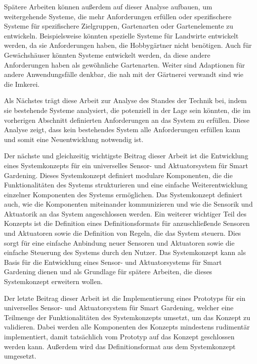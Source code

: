 Spätere Arbeiten können außerdem auf dieser Analyse aufbauen, um weitergehende Systeme, die mehr Anforderungen erfüllen oder spezifischere Systeme für spezifischere Zielgruppen, Gartenarten oder Gartenelemente zu entwickeln.
Beispielsweise könnten spezielle Systeme für Landwirte entwickelt werden, da sie Anforderungen haben, die Hobbygärtner nicht benötigen.
Auch für Gewächshäuser könnten Systeme entwickelt werden, da diese andere Anforderungen haben als gewöhnliche Gartenarten.
Weiter sind Adaptionen für andere Anwendungsfälle denkbar, die nah mit der Gärtnerei verwandt sind wie die Imkerei.

Als Nächstes trägt diese Arbeit zur Analyse des Standes der Technik bei, indem sie bestehende Systeme analysiert, die potenziell in der Lage sein könnten, die im vorherigen Abschnitt definierten Anforderungen an das System zu erfüllen.
Diese Analyse zeigt, dass kein bestehendes System alle Anforderungen erfüllen kann und somit eine Neuentwicklung notwendig ist.

Der nächste und gleichzeitig wichtigste Beitrag dieser Arbeit ist die Entwicklung eines Systemkonzepts für ein universelles Sensor- und Aktuatorsystem für Smart Gardening.
Dieses Systemkonzept definiert modulare Komponenten, die die Funktionalitäten des Systems strukturieren und eine einfache Weiterentwicklung einzelner Komponenten des Systems ermöglichen.
Das Systemkonzept definiert auch, wie die Komponenten miteinander kommunizieren und wie die Sensorik und Aktuatorik an das System angeschlossen werden.
Ein weiterer wichtiger Teil des Konzepts ist die Definition eines Definitionsformats für anzuschließende Sensoren und Aktuatoren sowie die Definition von Regeln, die das System steuern.
Dies sorgt für eine einfache Anbindung neuer Sensoren und Aktuatoren sowie die einfache Steuerung des Systems durch den Nutzer.
Das Systemkonzept kann als Basis für die Entwicklung eines Sensor- und Aktuatorsystems für Smart Gardening dienen und als Grundlage für spätere Arbeiten, die dieses Systemkonzept erweitern wollen.

Der letzte Beitrag dieser Arbeit ist die Implementierung eines Prototyps für ein universelles Sensor- und Aktuatorsystem für Smart Gardening, welcher eine Teilmenge der Funktionalitäten des Systemkonzepts umsetzt, um das Konzept zu validieren.
Dabei werden alle Komponenten des Konzepts mindestens rudimentär implementiert, damit tatsächlich vom Prototyp auf das Konzept geschlossen werden kann.
Außerdem wird das Definitionsformat aus dem Systemkonzept umgesetzt. %

